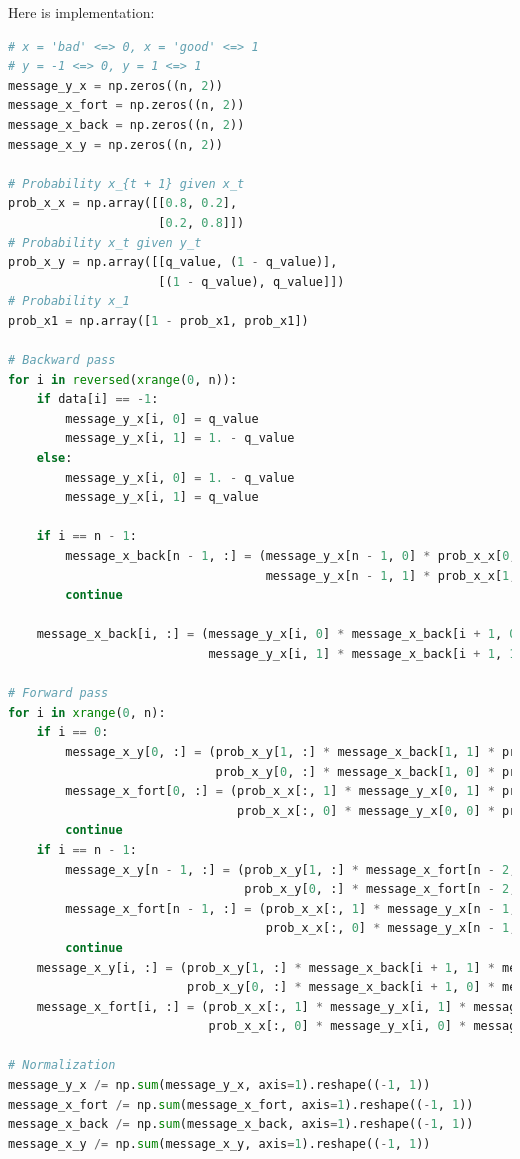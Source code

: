 \documentclass[a4paper]{article}
\begin{document}
Here is implementation:
\begin{lstlisting}[language=Python]
# x = 'bad' <=> 0, x = 'good' <=> 1
# y = -1 <=> 0, y = 1 <=> 1
message_y_x = np.zeros((n, 2))
message_x_fort = np.zeros((n, 2))
message_x_back = np.zeros((n, 2))
message_x_y = np.zeros((n, 2))

# Probability x_{t + 1} given x_t
prob_x_x = np.array([[0.8, 0.2],
                     [0.2, 0.8]])
# Probability x_t given y_t
prob_x_y = np.array([[q_value, (1 - q_value)],
                     [(1 - q_value), q_value]])
# Probability x_1
prob_x1 = np.array([1 - prob_x1, prob_x1])

# Backward pass
for i in reversed(xrange(0, n)):
    if data[i] == -1:
        message_y_x[i, 0] = q_value
        message_y_x[i, 1] = 1. - q_value
    else:
        message_y_x[i, 0] = 1. - q_value
        message_y_x[i, 1] = q_value

    if i == n - 1:
        message_x_back[n - 1, :] = (message_y_x[n - 1, 0] * prob_x_x[0, :] +
                                    message_y_x[n - 1, 1] * prob_x_x[1, :])
        continue

    message_x_back[i, :] = (message_y_x[i, 0] * message_x_back[i + 1, 0] * prob_x_x[0, :] +
                            message_y_x[i, 1] * message_x_back[i + 1, 1] * prob_x_x[1, :])

# Forward pass
for i in xrange(0, n):
    if i == 0:
        message_x_y[0, :] = (prob_x_y[1, :] * message_x_back[1, 1] * prob_x1[1] +
                             prob_x_y[0, :] * message_x_back[1, 0] * prob_x1[0])
        message_x_fort[0, :] = (prob_x_x[:, 1] * message_y_x[0, 1] * prob_x1[1] +
                                prob_x_x[:, 0] * message_y_x[0, 0] * prob_x1[0])
        continue
    if i == n - 1:
        message_x_y[n - 1, :] = (prob_x_y[1, :] * message_x_fort[n - 2, 1] +
                                 prob_x_y[0, :] * message_x_fort[n - 2, 0])
        message_x_fort[n - 1, :] = (prob_x_x[:, 1] * message_y_x[n - 1, 1] * message_x_fort[n - 2, 1] +
                                    prob_x_x[:, 0] * message_y_x[n - 1, 0] * message_x_fort[n - 2, 0])
        continue
    message_x_y[i, :] = (prob_x_y[1, :] * message_x_back[i + 1, 1] * message_x_fort[i - 1, 1] +
                         prob_x_y[0, :] * message_x_back[i + 1, 0] * message_x_fort[i - 1, 0])
    message_x_fort[i, :] = (prob_x_x[:, 1] * message_y_x[i, 1] * message_x_fort[i - 1, 1] +
                            prob_x_x[:, 0] * message_y_x[i, 0] * message_x_fort[i - 1, 0])

# Normalization
message_y_x /= np.sum(message_y_x, axis=1).reshape((-1, 1))
message_x_fort /= np.sum(message_x_fort, axis=1).reshape((-1, 1))
message_x_back /= np.sum(message_x_back, axis=1).reshape((-1, 1))
message_x_y /= np.sum(message_x_y, axis=1).reshape((-1, 1))
\end{lstlisting}
\end{document}

